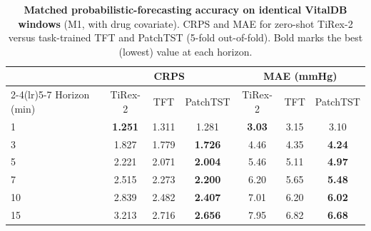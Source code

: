 \begin{table}[t]
\centering\footnotesize
\caption{\textbf{Matched probabilistic-forecasting accuracy on identical VitalDB windows} (M1, with drug covariate). CRPS and MAE for zero-shot TiRex-2 versus task-trained TFT and PatchTST (5-fold out-of-fold). Bold marks the best (lowest) value at each horizon.}
\label{tab:forecast}
\begin{tabular}{lcccccc}
\toprule
& \multicolumn{3}{c}{CRPS} & \multicolumn{3}{c}{MAE (mmHg)} \\
\cmidrule(lr){2-4}\cmidrule(lr){5-7}
Horizon (min) & TiRex-2 & TFT & PatchTST & TiRex-2 & TFT & PatchTST \\
\midrule
1  & \textbf{1.251} & 1.311 & 1.281 & \textbf{3.03} & 3.15 & 3.10 \\
3  & 1.827 & 1.779 & \textbf{1.726} & 4.46 & 4.35 & \textbf{4.24} \\
5  & 2.221 & 2.071 & \textbf{2.004} & 5.46 & 5.11 & \textbf{4.97} \\
7  & 2.515 & 2.273 & \textbf{2.200} & 6.20 & 5.65 & \textbf{5.48} \\
10 & 2.839 & 2.482 & \textbf{2.407} & 7.01 & 6.20 & \textbf{6.02} \\
15 & 3.213 & 2.716 & \textbf{2.656} & 7.95 & 6.82 & \textbf{6.68} \\
\bottomrule
\end{tabular}
\end{table}

